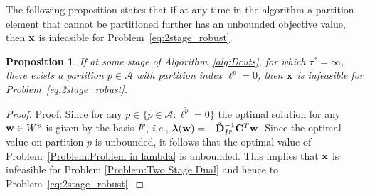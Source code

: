 \documentclass[12pt,x11names]{article}
\newtheorem{proposition}{Proposition} %
\theoremstyle{definition}
\newcommand{\ie}{{\em i.e.}, }
\newcommand{\bw}{{\bf w}}
\newcommand{\bx}{{\bf x}}
\newcommand{\bbc}{{\bf C}}
\newcommand{\bbd}{{\bf D}}
\newcommand{\blambda}{{\boldsymbol \lambda}}
\begin{document}
The following proposition states that if at any time in the algorithm a partition element that cannot be  partitioned further has an unbounded objective value, then $\bx$ is infeasible for Problem~\eqref{eq:2stage_robust}.
\begin{proposition}
If at some stage of Algorithm~\ref{alg:Dcuts}, for which $\tau^*=\infty$, there exists a partition $p\in\mathcal{A}$ with partition index $\ell^p=0$, then $\bx$ is infeasible for Problem~\eqref{eq:2stage_robust}.
\end{proposition}
\begin{proof}{Proof.}
Since for any $p\in \{\tilde{p}\in \mathcal{A}:\ell^{\tilde{p}}=0\}$ the optimal solution for any $\bw\in W^p$ is given by the basis $I^p$, \ie $\blambda(\bw)=-\tilde{\bbd}_{I^p}^{-1}\bbc^T\bw$. Since the optimal value on partition $p$ is unbounded, it follows that the optimal value of Problem~\eqref{Problem:Problem in lambda} is unbounded. This implies that $\bx$ is infeasible for Problem \eqref{Problem:Two Stage Dual} and hence to Problem~\eqref{eq:2stage_robust}. %
\end{proof}
\end{document}
